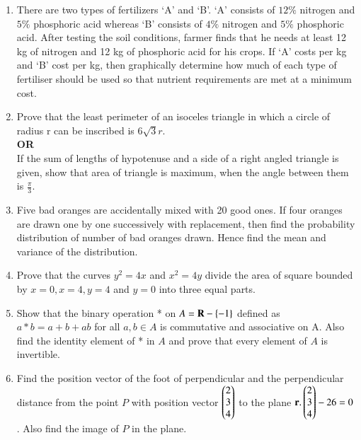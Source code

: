 \documentclass[journal,12pt,onecolumn]{IEEEtran}
\theoremstyle{remark}
\begin{document}
\begin{enumerate}
	\item There are two types of fertilizers `A' and `B'. `A' consists of $12\%$ nitrogen and $5\%$ phosphoric acid whereas `B' consists of $4\%$ nitrogen and $5\%$ phosphoric acid. After testing the soil conditions, farmer finds that he needs at least 12 kg of nitrogen and 12 kg of phosphoric acid for his crops. If `A' costs  per kg and `B' cost  per kg, then graphically determine how much of each type of fertiliser should be used so that nutrient requirements are met at a minimum cost.\\
	
	\item Prove that the least perimeter of an isoceles triangle in which a circle of radius r can be inscribed is $6\sqrt{3}r$.\\
	\textbf{OR}\\
	If the sum of lengths of hypotenuse and a side of a right angled triangle is given, show that area of triangle is maximum, when the angle between them is $\frac{\pi}{3}$.\\
	
	\item Five bad oranges are accidentally mixed with 20 good ones. If four oranges are drawn one by one successively with replacement, then find the probability distribution of number of bad oranges drawn. Hence find the mean and variance of the distribution.\\
	
	\item Prove that the curves $y^2 = 4x$ and $x^2 = 4y$ divide the area of square bounded by $x=0, x=4, y=4$ and $y=0$ into three equal parts.\\
	
	\item Show that the binary operation *  on $A = \textbf{R} - \left\{-1\right\}$ defined as $a*b = a + b + ab$ for all $a, b \in A$  is commutative and associative on A. Also find the identity element of * in $A$ and prove that every element of $A$ is invertible.\\
	
	\item Find the position vector of the foot of perpendicular and the perpendicular distance from the point $P$ with position vector $\begin{pmatrix}2\\3\\4\end{pmatrix}$ to the plane $\mathbf{r}.\begin{pmatrix}2\\3\\4\end{pmatrix} - 26 =0$. Also find the image of $P$ in the plane.
	
	
	
	
\end{enumerate}
\end{document}
